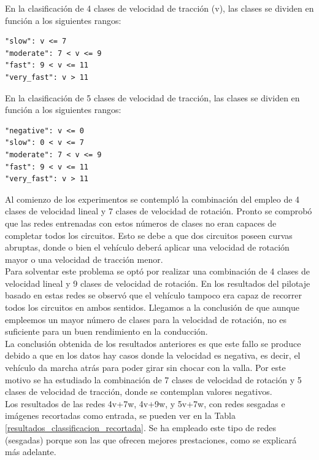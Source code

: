 En la clasificación de 4 clases de velocidad de tracción (v), las clases se dividen en función a los siguientes rangos:

\vspace{10pt}
\begin{lstlisting}
"slow": v <= 7
"moderate": 7 < v <= 9
"fast": 9 < v <= 11
"very_fast": v > 11
\end{lstlisting}
\vspace{20pt}

En la clasificación de 5 clases de velocidad de tracción, las clases se dividen en función a los siguientes rangos:

\vspace{10pt}
\begin{lstlisting}
"negative": v <= 0
"slow": 0 < v <= 7
"moderate": 7 < v <= 9
"fast": 9 < v <= 11
"very_fast": v > 11
\end{lstlisting}
\vspace{20pt}




Al comienzo de los experimentos se contempló la combinación del empleo de 4 clases de velocidad lineal y 7 clases de velocidad de rotación. Pronto se comprobó que las redes entrenadas con estos números de clases no eran capaces de completar todos los circuitos. Esto se debe a que dos circuitos poseen curvas abruptas, donde o bien el vehículo deberá aplicar una velocidad de rotación mayor o una velocidad de tracción menor.\\

Para solventar este problema se optó por realizar una combinación de 4 clases de velocidad lineal y 9 clases de velocidad de rotación. En los resultados del pilotaje basado en estas redes se observó que el vehículo tampoco era capaz de recorrer todos los circuitos en ambos sentidos. Llegamos a la conclusión de que aunque empleemos un mayor número de clases para la velocidad de rotación, no es suficiente para un buen rendimiento en la conducción.\\

La conclusión obtenida de los resultados anteriores es que este fallo se produce debido a que en los datos hay casos donde la velocidad es negativa, es decir, el vehículo da marcha atrás para poder girar sin chocar con la valla. Por este motivo se ha estudiado la combinación de 7 clases de velocidad de rotación y 5 clases de velocidad de tracción, donde se contemplan valores negativos.\\


Los resultados de las redes 4v+7w, 4v+9w, y 5v+7w, con redes sesgadas e imágenes recortadas como entrada, se pueden ver en la Tabla \ref{resultados_classificacion_recortada}. Se ha empleado este tipo de redes (sesgadas) porque son las que ofrecen mejores prestaciones, como se explicará más adelante.\\



